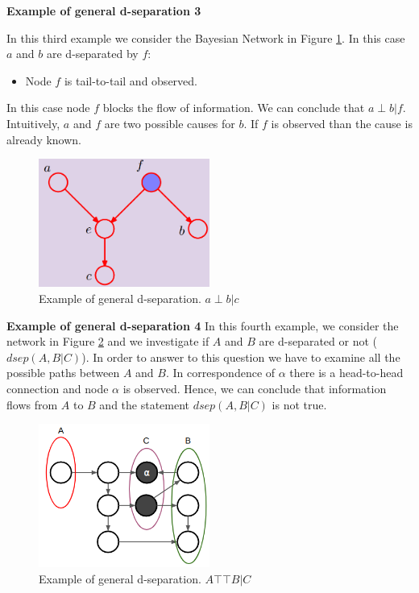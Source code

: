 \textbf{Example of general d-separation 3}

In this third example we consider the Bayesian Network in Figure
\ref{fig:exampleDSeparation2}. In this case $a$ and $b$ are d-separated by $f$:
\begin{itemize}
	\item Node $f$ is tail-to-tail and observed.
\end{itemize}

In this case node $f$ blocks the flow of information. We can conclude that
$a \perp b | f$. Intuitively, $a$ and $f$ are two possible causes for $b$. If $f$
is observed than the cause is already known.
\newline

\begin{figure}[H]
	\centering
	\includegraphics[width=0.5\textwidth]{
		images/08_BayesianNetworks_exampleGeneralDSeparation2.png
	}
	\caption{Example of general d-separation. $a \perp b | c$ }
	\label{fig:exampleDSeparation2}
\end{figure}

\textbf{Example of general d-separation 4}
\newline
In this fourth example, we consider the network in Figure
\ref{fig:exampleDSeparation4} and we investigate if $A$ and $B$ are d-separated
or not ($\mathit{dsep}(A,B|C)$). In order to answer to this question we have to examine
all the possible paths between $A$ and $B$. In correspondence of $\alpha$ there
is a head-to-head connection and node $\alpha$ is observed. Hence, we can
conclude that information flows from $A$ to $B$ and the statement
$\mathit{dsep}(A,B|C)$ is not true.
\newline

\begin{figure}[H]
	\centering
	\includegraphics[width=0.5\textwidth]{
		images/08_BayesianNetworks_exampleGeneralDSeparation3.png
	}
	\caption{Example of general d-separation. $A \top\!\!\!\!\top B | C$ }
	\label{fig:exampleDSeparation4}
\end{figure}


